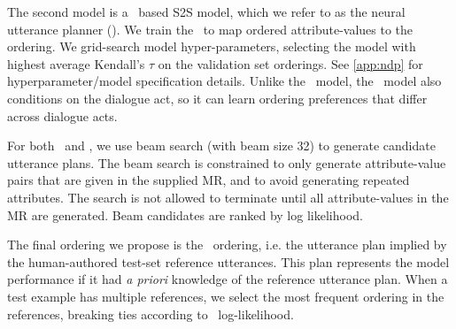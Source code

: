 The second model is a \biGRU~based S2S model, which we refer to as the neural
utterance planner (\NUP). We train the \NUP~to map  ordered
attribute-values to the  ordering. We grid-search model
hyper-parameters, selecting the model with highest average Kendall's $\tau$
\cite{kendall1938} on the validation set  orderings. See
\autoref{app:ndp} for hyperparameter/model specification details. Unlike the
\BgUP~model, the \NUP~model also conditions on the dialogue act, so it can
learn ordering preferences that differ across dialogue acts.

For both \BgUP~and \NUP, we use beam search (with beam size 32) to generate
candidate utterance plans. The beam search is constrained to only generate
attribute-value pairs that are given in the supplied MR, and to avoid
generating repeated attributes. The search is not allowed to terminate until
all attribute-values in the MR are generated.  Beam candidates are ranked by
log likelihood.

The final ordering we propose is the \Oracle~ordering, i.e. the utterance plan
implied by the human-authored test-set reference utterances. This plan
represents the model performance if it had \textit{a priori}  knowledge of the
reference utterance plan. When a test example has multiple references, we
select the most frequent ordering in the references, breaking ties according
to \BgUP~log-likelihood.

